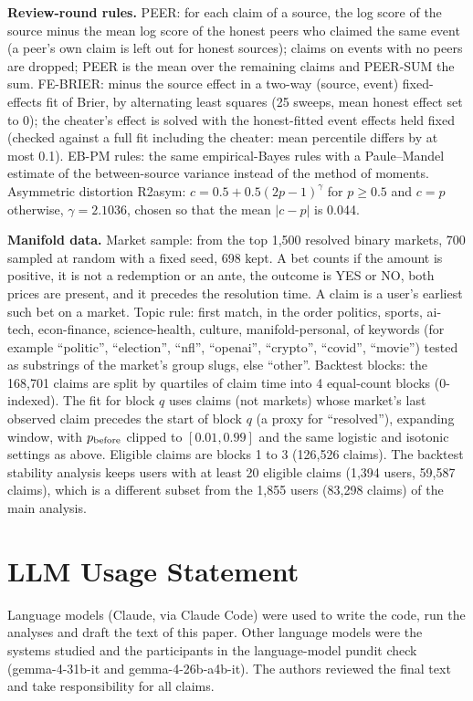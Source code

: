 \documentclass[10pt]{article}
\begin{document}
\textbf{Review-round rules.} PEER: for each claim of a source, the log score of the source minus the mean log score of the honest peers who claimed the same event (a peer's own claim is left out for honest sources); claims on events with no peers are dropped; PEER is the mean over the remaining claims and PEER-SUM the sum. FE-BRIER: minus the source effect in a two-way (source, event) fixed-effects fit of Brier, by alternating least squares (25 sweeps, mean honest effect set to 0); the cheater's effect is solved with the honest-fitted event effects held fixed (checked against a full fit including the cheater: mean percentile differs by at most 0.1). EB-PM rules: the same empirical-Bayes rules with a Paule--Mandel estimate of the between-source variance instead of the method of moments. Asymmetric distortion R2asym: $c=0.5+0.5(2p-1)^{\gamma}$ for $p\ge0.5$ and $c=p$ otherwise, $\gamma=2.1036$, chosen so that the mean $|c-p|$ is 0.044.

\textbf{Manifold data.} Market sample: from the top 1,500 resolved binary markets, 700 sampled at random with a fixed seed, 698 kept. A bet counts if the amount is positive, it is not a redemption or an ante, the outcome is YES or NO, both prices are present, and it precedes the resolution time. A claim is a user's earliest such bet on a market. Topic rule: first match, in the order politics, sports, ai-tech, econ-finance, science-health, culture, manifold-personal, of keywords (for example ``politic'', ``election'', ``nfl'', ``openai'', ``crypto'', ``covid'', ``movie'') tested as substrings of the market's group slugs, else ``other''. Backtest blocks: the 168,701 claims are split by quartiles of claim time into 4 equal-count blocks (0-indexed). The fit for block $q$ uses claims (not markets) whose market's last observed claim precedes the start of block $q$ (a proxy for ``resolved''), expanding window, with $p_{\rm before}$ clipped to $[0.01,0.99]$ and the same logistic and isotonic settings as above. Eligible claims are blocks 1 to 3 (126,526 claims). The backtest stability analysis keeps users with at least 20 eligible claims (1,394 users, 59,587 claims), which is a different subset from the 1,855 users (83,298 claims) of the main analysis.

\section*{LLM Usage Statement}
Language models (Claude, via Claude Code) were used to write the code, run the analyses and draft the text of this paper. Other language models were the systems studied and the participants in the language-model pundit check (gemma-4-31b-it and gemma-4-26b-a4b-it). The authors reviewed the final text and take responsibility for all claims.
\end{document}
